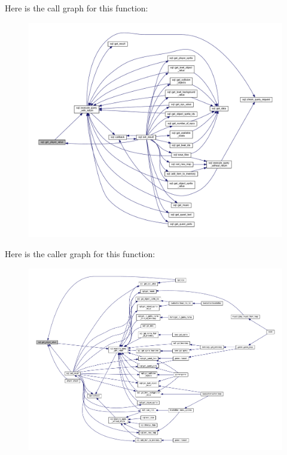 Here is the call graph for this function\+:
\nopagebreak
\begin{figure}[H]
\begin{center}
\leavevmode
\includegraphics[width=350pt]{classsql_ae560c01f2e8e57cee454ecd8e38616eb_cgraph}
\end{center}
\end{figure}
Here is the caller graph for this function\+:
\nopagebreak
\begin{figure}[H]
\begin{center}
\leavevmode
\includegraphics[width=350pt]{classsql_ae560c01f2e8e57cee454ecd8e38616eb_icgraph}
\end{center}
\end{figure}
\mbox{\label{classsql_a251f53bb3d5d98f821713a42212276e9}} 

